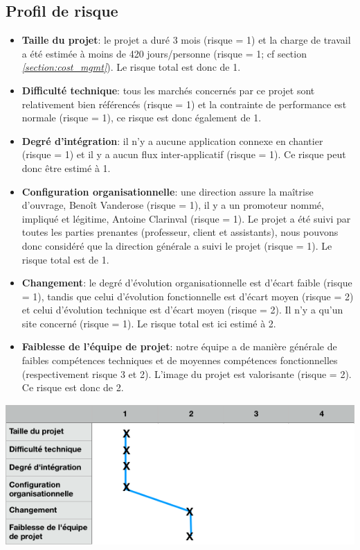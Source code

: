 \documentclass[t, 12pt, usenames,dvipsnames]{article}
\begin{document}
    \subsection{Profil de risque}
        \begin{itemize}
            \item \textbf{Taille du projet}: le projet a duré 3 mois (risque = 1) et la charge de travail a été estimée à moins de 420 jours/personne (risque = 1; cf section  \textit{\ref{section:cost_mgmt}}). Le risque total est donc de 1.
            \item \textbf{Difficulté technique}: tous les marchés concernés par ce projet sont relativement bien référencés (risque = 1) et la contrainte de performance est normale (risque = 1), ce risque est donc également de 1.
            \item \textbf{Degré d'intégration}: il n'y a aucune application connexe en chantier (risque = 1) et il y a aucun flux inter-applicatif (risque = 1). Ce risque peut donc être estimé à 1.
            \item \textbf{Configuration organisationnelle}: une direction assure la maîtrise d'ouvrage, Benoît Vanderose (risque = 1), il y a un promoteur nommé, impliqué et légitime, Antoine Clarinval (risque = 1). Le projet a été suivi par toutes les parties prenantes (professeur, client et assistants), nous pouvons donc considéré que la direction générale a suivi le projet (risque = 1). Le risque total est de 1.
            \item \textbf{Changement}: le degré d'évolution organisationnelle est d'écart faible (risque = 1), tandis que celui d'évolution fonctionnelle est d'écart moyen (risque = 2) et celui d'évolution technique est d'écart moyen (risque = 2). Il n'y a qu'un site concerné (risque = 1). Le risque total est ici estimé à 2.
            \item \textbf{Faiblesse de l'équipe de projet}: notre équipe a de manière générale de faibles compétences techniques et de moyennes compétences fonctionnelles (respectivement risque 3 et 2). L'image du projet est valorisante (risque = 2). Ce risque est donc de 2.
        \end{itemize}
        
        \begin{center}                               
            \includegraphics[scale=.65]{images/ProfilRisque.png}
            \label{fig:profil_risque}
        \end{center}
    
\end{document}
